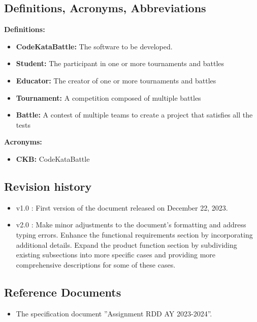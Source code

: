 \documentclass[a4paper, 11pt, titlepage]{article}
\begin{document}
\subsection{Definitions, Acronyms, Abbreviations}
\textbf{Definitions:}
\begin{itemize}
    \item \textbf{CodeKataBattle:} The software to be developed.
    \item \textbf{Student:} The participant in one or more tournaments and battles
    \item \textbf{Educator:} The creator of one or more tournaments and battles
    \item \textbf{Tournament:} A competition composed of multiple battles
    \item \textbf{Battle:} A contest of multiple teams to create a project that satisfies all the tests
\end{itemize}
\textbf{Acronyms:}
\begin{itemize}
    \item \textbf{CKB:} CodeKataBattle
\end{itemize}
\subsection{Revision history}
\begin{itemize}
    \item v1.0 : First version of the document released on December 22, 2023.
    \item v2.0 : Make minor adjustments to the document's formatting and address typing errors. Enhance the functional requirements section by incorporating additional details. Expand the product function section by subdividing existing subsections into more specific cases and providing more comprehensive descriptions for some of these cases.
\end{itemize}
\subsection{Reference Documents}
\begin{itemize}
    \item The specification document ”Assignment RDD AY 2023-2024”.
\end{itemize}
\end{document}
